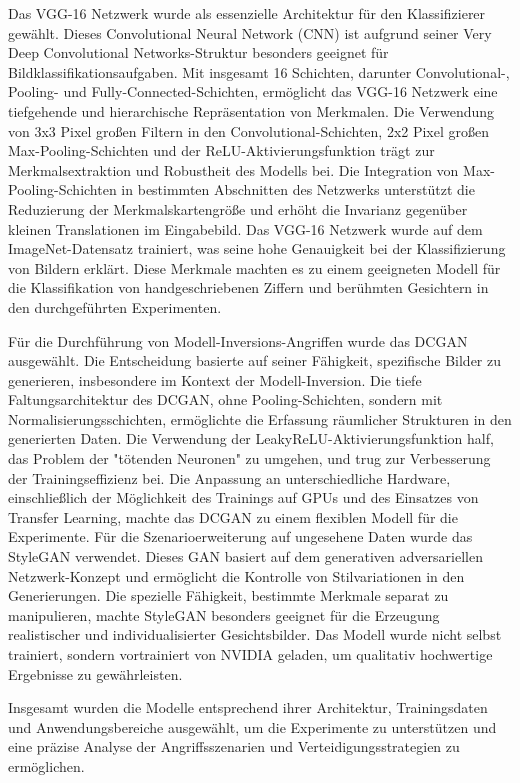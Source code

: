 Das VGG-16 Netzwerk wurde als essenzielle Architektur für den Klassifizierer gewählt. Dieses Convolutional Neural Network (CNN) ist aufgrund seiner \glqq Very Deep Convolutional Networks\grqq-Struktur besonders geeignet für Bildklassifikationsaufgaben. Mit insgesamt 16 Schichten, darunter Convolutional-, Pooling- und Fully-Connected-Schichten, ermöglicht das VGG-16 Netzwerk eine tiefgehende und hierarchische Repräsentation von Merkmalen. Die Verwendung von 3x3 Pixel großen Filtern in den Convolutional-Schichten, 2x2 Pixel großen Max-Pooling-Schichten und der ReLU-Aktivierungsfunktion trägt zur Merkmalsextraktion und Robustheit des Modells bei. Die Integration von Max-Pooling-Schichten in bestimmten Abschnitten des Netzwerks unterstützt die Reduzierung der Merkmalskartengröße und erhöht die Invarianz gegenüber kleinen Translationen im Eingabebild. Das VGG-16 Netzwerk wurde auf dem ImageNet-Datensatz trainiert, was seine hohe Genauigkeit bei der Klassifizierung von Bildern erklärt. Diese Merkmale machten es zu einem geeigneten Modell für die Klassifikation von handgeschriebenen Ziffern und berühmten Gesichtern in den durchgeführten Experimenten.

Für die Durchführung von Modell-Inversions-Angriffen wurde das DCGAN ausgewählt. Die Entscheidung basierte auf seiner Fähigkeit, spezifische Bilder zu generieren, insbesondere im Kontext der Modell-Inversion. Die tiefe Faltungsarchitektur des DCGAN, ohne Pooling-Schichten, sondern mit Normalisierungsschichten, ermöglichte die Erfassung räumlicher Strukturen in den generierten Daten. Die Verwendung der LeakyReLU-Aktivierungsfunktion half, das Problem der "tötenden Neuronen" zu umgehen, und trug zur Verbesserung der Trainingseffizienz bei. Die Anpassung an unterschiedliche Hardware, einschließlich der Möglichkeit des Trainings auf GPUs und des Einsatzes von Transfer Learning, machte das DCGAN zu einem flexiblen Modell für die Experimente. Für die Szenarioerweiterung auf ungesehene Daten wurde das StyleGAN verwendet. Dieses GAN basiert auf dem generativen adversariellen Netzwerk-Konzept und ermöglicht die Kontrolle von Stilvariationen in den Generierungen. Die spezielle Fähigkeit, bestimmte Merkmale separat zu manipulieren, machte StyleGAN besonders geeignet für die Erzeugung realistischer und individualisierter Gesichtsbilder. Das Modell wurde nicht selbst trainiert, sondern vortrainiert von NVIDIA geladen, um qualitativ hochwertige Ergebnisse zu gewährleisten.

Insgesamt wurden die Modelle entsprechend ihrer Architektur, Trainingsdaten und Anwendungsbereiche ausgewählt, um die Experimente zu unterstützen und eine präzise Analyse der Angriffsszenarien und Verteidigungsstrategien zu ermöglichen.
